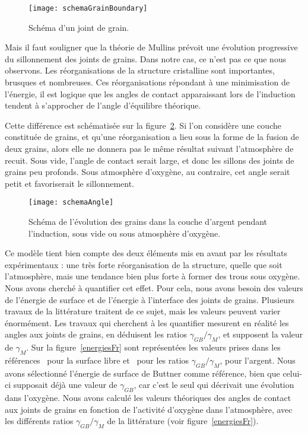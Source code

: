 \begin{figure}[!htb]
\centering
\texttt{[image: schemaGrainBoundary]}
\caption{Schéma d'un joint de grain.}
\label{schemaGrainBoundary}
\end{figure}
Mais il faut souligner que la théorie de Mullins prévoit une évolution progressive du sillonnement des joints de grains. Dans notre cas, ce n'est pas ce que nous observons. Les réorganisations de la structure cristalline sont importantes, brusques et nombreuses. Ces réorganisations répondant à une minimisation de l'énergie, il est logique que les angles de contact apparaissant lors de l'induction tendent à s'approcher de l'angle d'équilibre théorique.\par 
Cette différence est schématisée sur la figure~\ref{schemaAngle}. Si l'on considère une couche constituée de grains, et qu'une réorganisation a lieu sous la forme de la fusion de deux grains, alors elle ne donnera pas le même résultat suivant l'atmosphère de recuit. Sous vide, l'angle de contact serait large, et donc les sillons des joints de grains peu profonds. Sous atmosphère d'oxygène, au contraire, cet angle serait petit et favoriserait le sillonnement.\par 
\begin{figure}[!htb]
\centering
\texttt{[image: schemaAngle]}
\caption{Schéma de l'évolution des grains dans la couche d'argent pendant l'induction, sous vide ou sous atmosphère d'oxygène.}
\label{schemaAngle}
\end{figure}
Ce modèle tient bien compte des deux éléments mis en avant par les résultats expérimentaux : une très forte réorganisation de la structure, quelle que soit l'atmosphère, mais une tendance bien plus forte à former des trous sous oxygène. Nous avons cherché à quantifier cet effet. Pour cela, nous avons besoin des valeurs de l'énergie de surface et de l'énergie à l'interface des joints de grains. Plusieurs travaux de la littérature traitent de ce sujet, mais les valeurs peuvent varier énormément. Les travaux qui cherchent à les quantifier mesurent en réalité les angles aux joints de grains, en déduisent les ratios $\gamma_{GB}/\gamma_M$, et supposent la valeur de $\gamma_M$. Sur la figure~\ref{energiesFr} sont représentées les valeurs prises dans les références~\cite{buttner1952adsorption} pour la surface libre et~\cite{inman1963interfacial, fiala1975surface, kudrman1969relative} pour les ratios  $\gamma_{GB}/\gamma_M$, pour l'argent. Nous avons sélectionné l'énergie de surface de Buttner comme référence, bien que celui-ci supposait déjà une valeur de $\gamma_{GB}$, car c'est le seul qui décrivait une évolution dans l'oxygène. Nous avons calculé les valeurs théoriques des angles de contact aux joints de grains en fonction de l'activité d'oxygène dans l'atmosphère, avec les différents ratios $\gamma_{GB}/\gamma_M$ de la littérature (voir figure~\ref{energiesFr}).\par 
